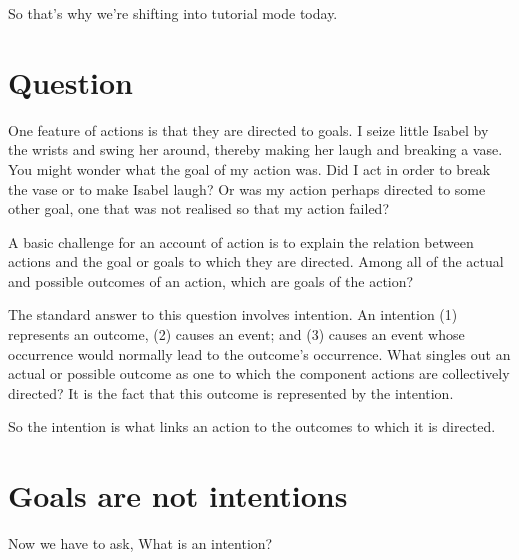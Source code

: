 \documentclass[12pt,\papersize]{extarticle}
\begin{document}
So that's why we're shifting into tutorial mode today.



%
%
%
%


\section{Question}
One feature of actions is that they are directed to goals.
I seize little Isabel by the wrists and swing her around, thereby  making her laugh and breaking a vase.
You might wonder what the goal of my action was.
Did I act in order to break the  vase or to make Isabel laugh?
Or was my action perhaps directed to some other goal, one that was not realised so that my action failed?

A basic challenge for an account of action is to explain the relation between actions and the goal or goals to which they are directed.
Among all of the actual and possible outcomes of an action, which are goals of the action?

The standard answer to this question involves intention.
An intention (1) represents an outcome, (2) causes an event; and (3) causes an event whose occurrence would normally lead to the outcome’s occurrence.
What singles out an actual or possible outcome as one to which the component actions are collectively directed?  It is the fact that this outcome is represented by the intention.

So the intention is what links an action to the outcomes to which it is directed.


\section{Goals are not intentions}
Now we have to ask, What is an intention?
\end{document}
